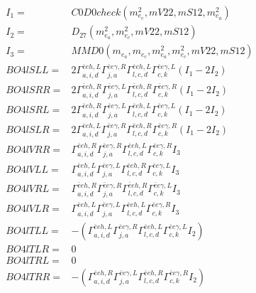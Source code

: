 \documentclass[A4,landscape]{article}
\begin{document}
\begin{align} 
I_1 = & C0D0check(m^2_{e_{{c}}}, mV22, mS12, m^2_{e_{{a}}}) \\ 
I_2 = & D_{27}(m^2_{e_{{a}}}, m^2_{e_{{c}}}, mV22, mS12) \\ 
I_3 = & MMD0(m_{e_{{a}}}, m_{e_{{c}}}, m^2_{e_{{a}}}, m^2_{e_{{c}}}, mV22, mS12) \\ 
  BO4lSLL= & 2  \Gamma^{\bar{e}e h ,L}_{a, i, d} \Gamma^{\bar{e}e \gamma ,R}_{j, a} \Gamma^{\bar{e}e h ,L}_{l, c, d} \Gamma^{\bar{e}e \gamma ,L}_{c, k} (I_1 - 2 I_2) \\ 
  BO4lSRR= & 2  \Gamma^{\bar{e}e h ,R}_{a, i, d} \Gamma^{\bar{e}e \gamma ,L}_{j, a} \Gamma^{\bar{e}e h ,R}_{l, c, d} \Gamma^{\bar{e}e \gamma ,R}_{c, k} (I_1 - 2 I_2) \\ 
  BO4lSRL= & 2  \Gamma^{\bar{e}e h ,R}_{a, i, d} \Gamma^{\bar{e}e \gamma ,L}_{j, a} \Gamma^{\bar{e}e h ,L}_{l, c, d} \Gamma^{\bar{e}e \gamma ,L}_{c, k} (I_1 - 2 I_2) \\ 
  BO4lSLR= & 2  \Gamma^{\bar{e}e h ,L}_{a, i, d} \Gamma^{\bar{e}e \gamma ,R}_{j, a} \Gamma^{\bar{e}e h ,R}_{l, c, d} \Gamma^{\bar{e}e \gamma ,R}_{c, k} (I_1 - 2 I_2) \\ 
  BO4lVRR= &  \Gamma^{\bar{e}e h ,R}_{a, i, d} \Gamma^{\bar{e}e \gamma ,R}_{j, a} \Gamma^{\bar{e}e h ,L}_{l, c, d} \Gamma^{\bar{e}e \gamma ,R}_{c, k} I_3 \\ 
  BO4lVLL= &  \Gamma^{\bar{e}e h ,L}_{a, i, d} \Gamma^{\bar{e}e \gamma ,L}_{j, a} \Gamma^{\bar{e}e h ,R}_{l, c, d} \Gamma^{\bar{e}e \gamma ,L}_{c, k} I_3 \\ 
  BO4lVRL= &  \Gamma^{\bar{e}e h ,R}_{a, i, d} \Gamma^{\bar{e}e \gamma ,R}_{j, a} \Gamma^{\bar{e}e h ,R}_{l, c, d} \Gamma^{\bar{e}e \gamma ,L}_{c, k} I_3 \\ 
  BO4lVLR= &  \Gamma^{\bar{e}e h ,L}_{a, i, d} \Gamma^{\bar{e}e \gamma ,L}_{j, a} \Gamma^{\bar{e}e h ,L}_{l, c, d} \Gamma^{\bar{e}e \gamma ,R}_{c, k} I_3 \\ 
  BO4lTLL= & -( \Gamma^{\bar{e}e h ,L}_{a, i, d} \Gamma^{\bar{e}e \gamma ,R}_{j, a} \Gamma^{\bar{e}e h ,L}_{l, c, d} \Gamma^{\bar{e}e \gamma ,L}_{c, k} I_2) \\ 
  BO4lTLR= & 0 \\ 
  BO4lTRL= & 0 \\ 
  BO4lTRR= & -( \Gamma^{\bar{e}e h ,R}_{a, i, d} \Gamma^{\bar{e}e \gamma ,L}_{j, a} \Gamma^{\bar{e}e h ,R}_{l, c, d} \Gamma^{\bar{e}e \gamma ,R}_{c, k} I_2) \\ 
\end{align} 
\end{document}
